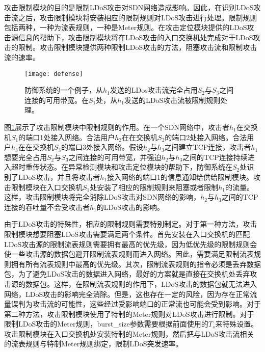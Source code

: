 攻击限制模块的目的是限制LDoS攻击对SDN网络造成影响。因此，在识别LDoS攻击流之后，攻击限制模块将安装相应的限制规则对LDoS攻击进行处理。限制规则包括两种，一种为流表规则，一种是Meter规则。在攻击定位模块提供的LDoS攻击源信息的帮助下，攻击限制模块将在LDoS攻击的入口交换机处完成对于LDoS攻击的限制。攻击限制模块提供两种限制LDoS攻击的方法，阻塞攻击流和限制攻击流的速率。


\begin{figure}
    \centering
    \texttt{[image: defense]}
    \caption{防御系统的一个例子，从$h_1$发送的LDos攻击流完全占用$S_2$与$S_3$之间连接的可用带宽。在$S_1$处，从$h_1$发送的LDoS攻击流被限制规则处理。}
    \label{fig:defense}
\end{figure}

图\ref{fig:defense}展示了攻击限制模块中限制规则的作用。在一个SDN网络中，攻击者$h_1$在交换机$S_1$的端口1处接入网络。合法用户$h_2$在在交换机$S_2$的端口2处接入网络。合法用户$h_3$在在交换机$S_3$的端口3处接入网络。假设$h_2$与$h_3$之间建立TCP连接，攻击者$h_1$想要完全占用$S_2$与$S_3$之间连接的可用带宽，并强迫$h_2$与$h_3$之间的TCP连接持续进入超时重传状态。在异常检测模块和攻击定位模块的帮助下，防御系统在$S_2$处识别了LDoS攻击，并且将攻击者$h_1$接入网络的端口1的信息通知给供给限制模块。攻击限制模块在入口交换机$S_1$处安装了相应的限制规则来阻塞或者限制$h_1$的流量。这样，攻击限制模块将完全消除LDoS攻击对SDN网络的影响，$h_2$与$h_3$之间的TCP连接的吞吐量不会受攻击者$h_1$的LDoS攻击的影响。



由于LDoS攻击的特殊性，相应的限制规则需要特别制定。对于第一种方法，攻击限制模块想要阻塞LDoS攻击需要满足两个条件。首先安装在入口交换机的匹配LDoS攻击源的限制流表规则需要拥有最高的优先级，因为低优先级的限制规则会使一些攻击源的数据包避开限制流表规则而进入网络。因此，需要满足限制流表规则拥有所有流表规则中最高的优先级。其次，限制流表规则的指令必须是丢弃数据包，为了避免LDoS攻击的数据进入网络，最好的方案就是直接在交换机处丢弃攻击源的数据包。这样，在限制流表规则的作用下，LDoS攻击的数据包就无法进入网络，LDoS攻击的影响完全消除。但是，这也存在一定的风险，因为存在正常流量误判为攻击流的可能性，这些经过受影响端口的正常流也可能会受到影响。对于第二种方法，攻击限制模块使用了特制的Meter规则对LDoS攻击进行限制。对于限制LDoS攻击的Meter规则，burst\_size参数需要根据前面使用的$T_s$来特殊设置。攻击限制模块在入口交换机处安装特制的Meter规则，然后把与LDoS攻击流相关的流表规则与特制Meter规则绑定，限制LDoS突发速率。

